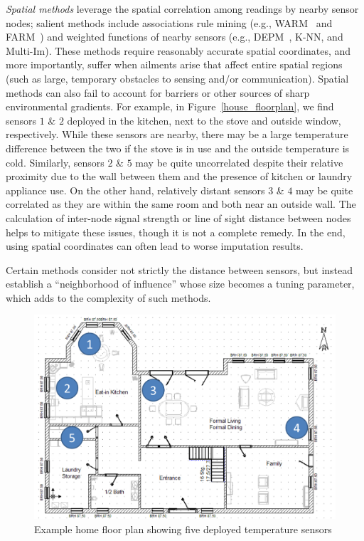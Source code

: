 {\em Spatial methods} leverage the spatial correlation among readings
by nearby sensor nodes; salient methods include associations rule
mining (e.g., WARM~\cite{le2005estimating} and
FARM~\cite{Gruenwald:FARM}) 
and weighted functions of nearby sensors (e.g., DEPM~\cite{li2008data},
K-NN\cite{pan2010k}, and Multi-Im\cite{yuan2000multiple}).
These methods require reasonably accurate spatial coordinates, and
more importantly, suffer when ailments arise that affect entire
spatial regions (such as large, temporary obstacles to sensing and/or communication).
Spatial methods can also fail to account for barriers or other
sources of sharp environmental gradients.
For example, in Figure~\ref{house_floorplan}, we find
sensors $1$ \& $2$ deployed in the kitchen, next to the stove and
outside window, respectively. While these sensors are nearby, 
there may be a large temperature difference between the two if
the stove is in use and the outside temperature is cold.
Similarly, sensors $2$ \& $5$
may be quite uncorrelated despite their relative proximity due to the
wall between them and the presence of kitchen or laundry appliance
use.  On the other hand, relatively distant sensors $3$ \& $4$
may be quite correlated as they are within the same room and both
near an outside wall. The calculation of
inter-node signal strength or line of sight distance between nodes
helps to mitigate these issues, though it is not
a complete remedy.  In the end, using spatial
coordinates can often lead to worse imputation results.

Certain methods consider not strictly the distance between sensors,
but instead establish a ``neighborhood of influence'' whose size
becomes a tuning parameter, which adds to the complexity of such methods.

\begin{figure}[t]
\centering
\includegraphics[scale=0.3]{house_floorplan.png}
\caption{Example home floor plan showing five deployed temperature sensors} \label{house_floorplan}
\label{fig:example_home_floorplan}
\vspace{-0.1in}
\end{figure}

